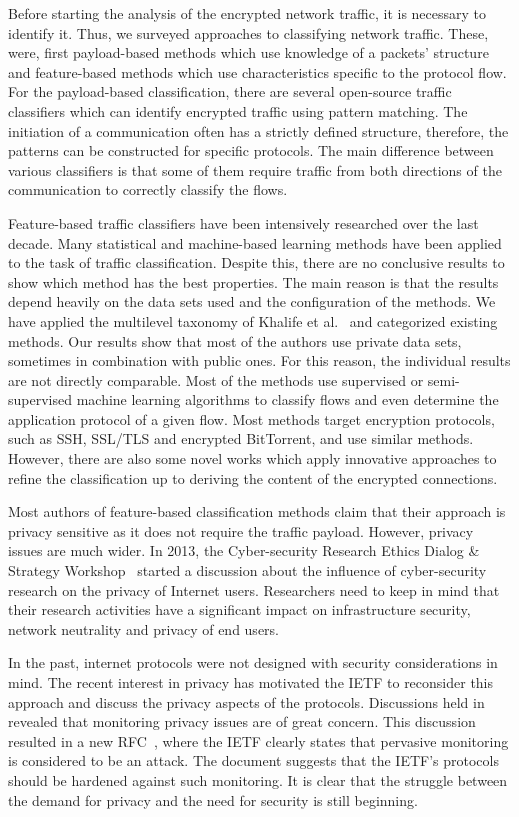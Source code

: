 Before starting the analysis of the encrypted network traffic, it is necessary to identify it. Thus, we surveyed approaches to classifying network traffic. These, were, first payload-based methods which use knowledge of a packets' structure and feature-based methods which use characteristics specific to the protocol flow. For the payload-based classification, there are several open-source traffic classifiers which can identify encrypted traffic using pattern matching. The initiation of a communication often has a strictly defined structure, therefore, the patterns can be constructed for specific protocols. The main difference between various classifiers is that some of them require traffic from both directions of the communication to correctly classify the flows.

Feature-based traffic classifiers have been intensively researched over the last decade. Many statistical and machine-based learning methods have been applied to the task of traffic classification. Despite this, there are no conclusive results to show which method has the best properties. The main reason is that the results depend heavily on the data sets used and the configuration of the methods. We have applied the multilevel taxonomy of Khalife et al.~\cite{Khalife-2014-multilevel} and categorized existing methods. Our results show that most of the authors use private data sets, sometimes in combination with public ones. For this reason, the individual results are not directly comparable. Most of the methods use supervised or semi-supervised machine learning algorithms to classify flows and even determine the application protocol of a given flow. Most methods target encryption protocols, such as SSH, SSL/TLS and encrypted BitTorrent, and use similar methods. However, there are also some novel works which apply innovative approaches to refine the classification up to deriving the content of the encrypted connections.

Most authors of feature-based classification methods claim that their approach is privacy sensitive as it does not require the traffic payload. However, privacy issues are much wider. In 2013, the Cyber-security Research Ethics Dialog \& Strategy Workshop~\cite{CAIDA-2013-Cyber} started a discussion about the influence of cyber-security research on the privacy of Internet users. Researchers need to keep in mind that their research activities have a significant impact on infrastructure security, network neutrality and privacy of end users. 

In the past, internet protocols were not designed with security considerations in mind. The recent interest in privacy has motivated the IETF to reconsider this approach and discuss the privacy aspects of the protocols. Discussions held in~\cite{IETF-2014-IETF} revealed that monitoring privacy issues are of great concern. This discussion resulted in a new RFC~\cite{rfc7258}, where the IETF clearly states that pervasive monitoring is considered to be an attack. The document suggests that the IETF's protocols should be hardened against such monitoring. It is clear that the struggle between the demand for privacy and the need for security is still beginning.

